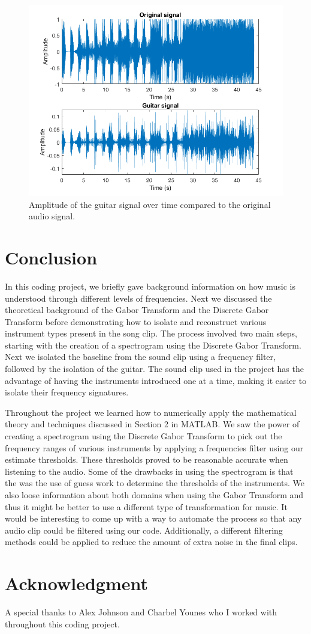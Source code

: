 \documentclass[12pt]{article}%
\begin{document}
\begin{figure}
    \center
    \includegraphics[width = 0.6\linewidth]{guitarline.png}
    \caption{Amplitude of the guitar signal over time compared to the original audio signal.}
\end{figure}

\section{Conclusion}\label{Sec: Conclusion}

In this coding project, we briefly gave background information on how music is understood through different levels of frequencies. Next we discussed the theoretical background of the Gabor Transform and the Discrete Gabor Transform before demonstrating how to isolate and reconstruct various instrument types present in the song clip. The process involved two main steps, starting with the creation of a spectrogram using the Discrete Gabor Transform. Next we isolated the baseline from the sound clip using a frequency filter, followed by the isolation of the guitar. The sound clip used in the project has the advantage of having the instruments introduced one at a time, making it easier to isolate their frequency signatures.

Throughout the project we learned how to numerically apply the mathematical theory and techniques discussed in Section 2 in MATLAB. We saw the power of creating a spectrogram using the Discrete Gabor Transform to pick out the frequency ranges of various instruments by applying a frequencies filter using our estimate thresholds. These thresholds proved to be reasonable accurate when listening to the audio. Some of the drawbacks in using the spectrogram is that the was the use of guess work to determine the thresholds of the instruments. We also loose information about both domains when using the Gabor Transform and thus it might be better to use a different type of transformation for music. It would be interesting to come up with a way to automate the process so that any audio clip could be filtered using our code. Additionally, a different filtering methods could be applied to reduce the amount of extra noise in the final clips.  



\section*{Acknowledgment}

A special thanks to Alex Johnson and Charbel Younes who I worked with throughout this coding project. 
\end{document}
